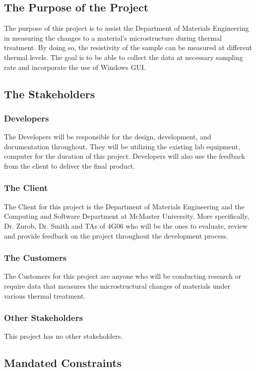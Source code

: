\documentclass[12pt, titlepage]{article}
\begin{document}
\subsection{The Purpose of the Project}
The purpose of this project is to assist the Department of Materials Engineering in measuring the changes to a material's microstructure during thermal treatment. 
By doing so, the resistivity of the sample can be measured at different thermal levels. The goal is to be able to collect the data at necessary sampling rate and 
incorporate the use of Windows GUI. 

\subsection{The Stakeholders}

\subsubsection{Developers}
The Developers will be responsible for the design, development, and documentation throughout. They will be utilizing the existing lab equipment, computer for the duration of this project.
Developers will also use the feedback from the client to deliver the final product. 

\subsubsection{The Client}
The Client for this project is the Department of Materials Engineering and the Computing and Software Department at McMaster University. More specifically, Dr. Zurob, Dr. Smith and TAs of 4G06 who will be the ones to evaluate, review and provide feedback on the project throughout the development process.

\subsubsection{The Customers}
The Customers for this project are anyone who will be conducting research or require data that measures the microstructural changes of materials under various thermal treatment.   

\subsubsection{Other Stakeholders}
This project has no other stakeholders.

\subsection{Mandated Constraints}
\end{document}
